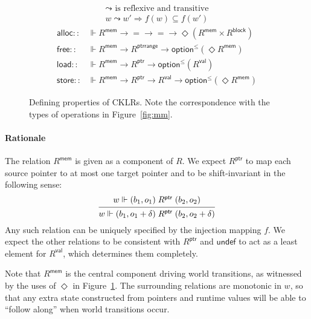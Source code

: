 \documentclass[11pt,oneside]{book}
\theoremstyle{definition}
\newcommand{\kw}[1]{\ensuremath{ \mathsf{#1} }}
\begin{document}
\begin{figure} %
  \begin{gather*}
    {\leadsto} \mbox{ is reflexive and transitive} \\
    w \leadsto w' \Rightarrow f(w) \subseteq f(w')
  \end{gather*}
  \begin{align*}
      \kw{alloc} ::
        &\Vdash R^\kw{mem} \rightarrow {=} \rightarrow {=} \rightarrow
        \Diamond (R^\kw{mem} \times R^\kw{block})
      \\
      \kw{free} ::
        &\Vdash R^\kw{mem} \rightarrow R^\kw{ptrrange} \rightarrow
        \kw{option}^\le(\Diamond R^\kw{mem})
      \\
      \kw{load} ::
        &\Vdash R^\kw{mem} \rightarrow R^\kw{ptr} \rightarrow
        \kw{option}^\le(R^\kw{val})
      \\
      \kw{store} ::
        &\Vdash R^\kw{mem} \rightarrow R^\kw{ptr} \rightarrow R^\kw{val} \rightarrow
        \kw{option}^\le(\Diamond R^\kw{mem})
  \end{align*}
  \caption[Defining properties of CKLRs]%
   {Defining properties of CKLRs.
    Note the correspondence with
    the types of operations in Figure~\ref{fig:mm}.}
  \label{fig:cklr-def}
\end{figure}

\paragraph{Rationale} %

The relation $R^\kw{mem}$ is given as a component of $R$.
We expect $R^\kw{ptr}$ to map
each source pointer to at most one target pointer
and to be shift-invariant in the following sense:
\[
  \begin{prooftree}
    \hypo{w \Vdash (b_1, o_1) \mathrel{R^\kw{ptr}} (b_2, o_2)}
    \infer1{
      w \Vdash (b_1, o_1 + \delta) \mathrel{R^\kw{ptr}} (b_2, o_2 + \delta)}
  \end{prooftree}
\]
Any such relation can be uniquely specified by
the injection mapping $f$.
We expect the other relations to be consistent with $R^\kw{ptr}$
and $\kw{undef}$ to act as a least element for $R^\kw{val}$,
which determines them completely.


Note that $R^\kw{mem}$
is the central component driving world transitions,
as witnessed by the uses of $\Diamond$ in Figure~\ref{fig:cklr-def}.
The surrounding relations are monotonic in $w$,
so that any extra state
constructed from pointers and runtime values
will be able to ``follow along'' when
world transitions occur.
\end{document}
